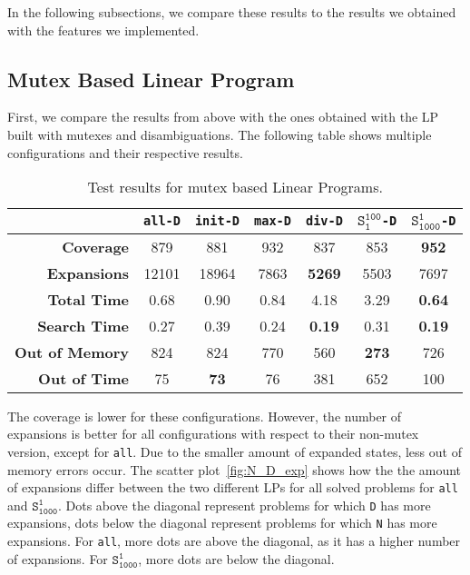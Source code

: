 In the following subsections, we compare these results to the results we obtained with the features we implemented.

\subsection{Mutex Based Linear Program}\label{subsec:mutex-based-linear-program}
First, we compare the results from above with the ones obtained with the LP built with mutexes and disambiguations.
The following table shows multiple configurations and their respective results.

\begin{table}[h!]
    \begin{center}
        \begin{tabular}{|r|c|c|c|c|c|c|}
            \hline
            & \textbf{\texttt{all-D}} & \textbf{\texttt{init-D}} & \textbf{\texttt{max-D}} & \textbf{\texttt{div-D}} & \textbf{$\texttt{S}_\texttt{1}^\texttt{100}$\texttt{-D}}& \textbf{$\texttt{S}_\texttt{1000}^\texttt{1}$\texttt{-D}}\\
            \hline \hline
            \textbf{Coverage}       & 879   & 881           & 932   & 837           & 853           & \textbf{952}  \\ \hline
            \textbf{Expansions}     & 12101 & 18964         & 7863  & \textbf{5269} & 5503          & 7697          \\ \hline
            \textbf{Total Time}     & 0.68  & 0.90          & 0.84  & 4.18          & 3.29          & \textbf{0.64} \\ \hline
            \textbf{Search Time}    & 0.27  & 0.39          & 0.24  & \textbf{0.19} & 0.31          & \textbf{0.19} \\ \hline
            \textbf{Out of Memory}  & 824   & 824           & 770   & 560           & \textbf{273}  & 726           \\ \hline
            \textbf{Out of Time}    & 75    & \textbf{73}   & 76    & 381           & 652           & 100           \\ \hline
        \end{tabular}
        \caption{Test results for mutex based Linear Programs.}
        \label{table:mutex_lp}
    \end{center}
\end{table}

The coverage is lower for these configurations.
However, the number of expansions is better for all configurations with respect to their non-mutex version, except for \texttt{all}.
Due to the smaller amount of expanded states, less out of memory errors occur.
The scatter plot~\ref{fig:N_D_exp} shows how the the amount of expansions differ between the two different LPs for all solved problems for \texttt{all} and $\texttt{S}_\texttt{1000}^\texttt{1}$.
Dots above the diagonal represent problems for which \texttt{D} has more expansions, dots below the diagonal represent problems for which \texttt{N} has more expansions.
For \texttt{all}, more dots are above the diagonal, as it has a higher number of expansions.
For $\texttt{S}_\texttt{1000}^\texttt{1}$, more dots are below the diagonal.


